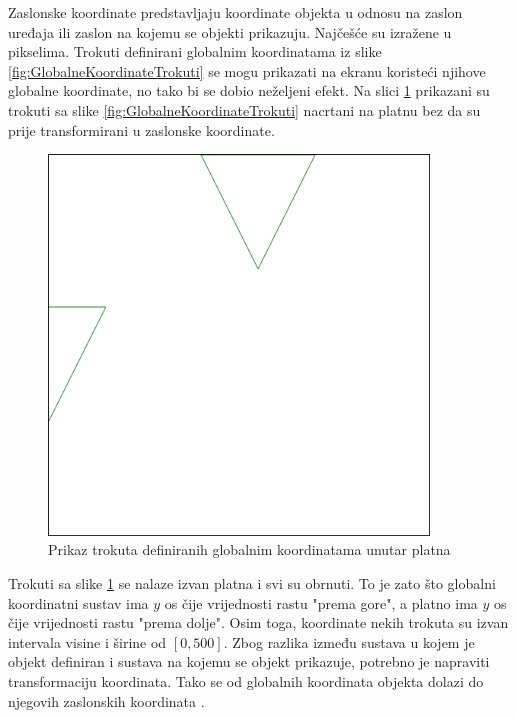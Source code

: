\documentclass{foi}
\begin{document}
Zaslonske koordinate predstavljaju koordinate objekta u odnosu na zaslon uređaja ili zaslon na kojemu se objekti prikazuju. Najčešće su izražene u pikselima. Trokuti definirani globalnim koordinatama iz slike \ref{fig:GlobalneKoordinateTrokuti} se mogu prikazati na ekranu koristeći njihove globalne koordinate, no tako bi se dobio neželjeni efekt. Na slici \ref{fig:ZaslonskeKoordinateCanvas} prikazani su trokuti sa slike \ref{fig:GlobalneKoordinateTrokuti} nacrtani na platnu bez da su prije transformirani u zaslonske koordinate. 
\begin{figure}[H]
    \centering
    \includegraphics[width=0.9\textwidth]{slike/4_ZaslonskeKoordinateCanvas.png}
    \captionsetup{justification=centering}
    \caption{Prikaz trokuta definiranih globalnim koordinatama unutar platna}
\label{fig:ZaslonskeKoordinateCanvas}
\end{figure}

Trokuti sa slike \ref{fig:ZaslonskeKoordinateCanvas} se nalaze izvan platna i svi su obrnuti. To je zato što globalni koordinatni sustav ima $y$ os čije vrijednosti rastu "prema gore", a platno ima $y$ os čije vrijednosti rastu "prema dolje". Osim toga, koordinate nekih trokuta su izvan intervala visine i širine od $[0, 500]$. Zbog razlika između sustava u kojem je objekt definiran i sustava na kojemu se objekt prikazuje, potrebno je napraviti transformaciju koordinata. Tako se od globalnih koordinata objekta dolazi do njegovih zaslonskih koordinata \parencite{MediumCoords2023}.
\end{document}
